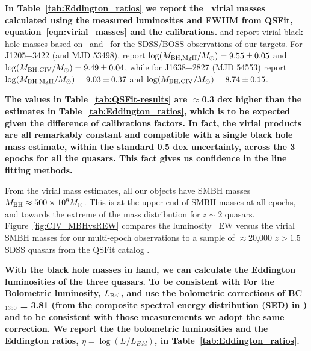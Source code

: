 \documentclass[fleqn,usenatbib]{mnras}
\begin{document}
{\bf In Table~\ref{tab:Eddington_ratios} we report the \civ\ virial
  masses calculated using the measured
luminosites and FWHM from QSFit, equation~\ref{eqn:virial_masses} and the
\citet{VestergaardPeterson2006} calibrations.} \citet{Shen2011} and
\citet{Kozlowski2017} report virial black hole masses based on \mgii\
and \civ\ for the SDSS/BOSS observations of our targets. For
J1205+3422 (and MJD 53498), \citet{Shen2011} report $\log (M_{\rm BH, MgII}/M_{\odot})
= 9.55 \pm 0.05$ and $\log(M_{\rm BH, CIV}/M_{\odot}) = 9.49 \pm
0.04$, while for J1638+2827 (MJD 54553) \citet{Shen2011} report 
$\log (M_{\rm BH, MgII}/M_{\odot}) = 9.03 \pm 0.37$ and
$\log(M_{\rm BH, CIV}/M_{\odot}) = 8.74 \pm 0.15$.

{\bf The values in Table~\ref{tab:QSFit-results} are
$\approx$0.3 dex higher than the estimates in
Table~\ref{tab:Eddington_ratios}, which is to be expected given the
difference of calibrations factors. In fact, the virial products are
all remarkably constant and compatible with a single black hole mass
estimate, within the standard 0.5 dex uncertainty, across the 3 epochs
for all the quasars.  This fact gives us confidence in the line
fitting methods.}

From the virial mass estimates, all our objects have SMBH masses
$M_{\rm BH} \approx 500\times10^{8} M_{\odot}$.  This is at the upper
end of SMBH masses at all epochs, and towards the extreme of the mass
distribution for $z\sim2$ quasars.  Figure~\ref{fig:CIV_MBHvsREW}
compares the luminosity \civ\ EW versus the virial SMBH masses for our
multi-epoch observations to a sample of $\approx$20,000 $z>1.5$ SDSS
quasars from the QSFit catalog \citep{Calderone2017}.

{\bf With the black hole masses in hand, we can calculate the
Eddington luminosities of the three quasars. To be consistent with For
the Bolometric luminosity, $L_{\rm Bol}$, \citet{Shen2011} and
\citet{Kozlowski2017} use the bolometric corrections of BC$_{1350}$ =
3.81 (from the composite spectral energy distribution (SED) in
\citet{Richards2006b}) and to be consistent with those measurements we
adopt the same correction.  We report the the bolometric luminosities
and the Eddington ratios, $\eta=\log(L_{}/L_{Edd})$, in
Table~\ref{tab:Eddington_ratios}.   }
\end{document}
